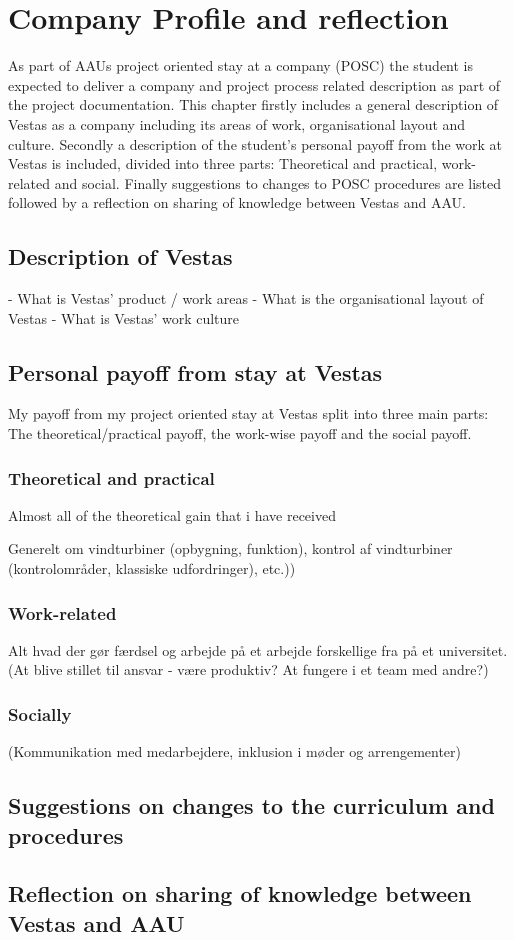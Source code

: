 \section{Company Profile and reflection} \label{company}
As part of AAUs project oriented stay at a company (POSC) the student is expected to deliver a company and project process related description as part of the project documentation. This chapter firstly includes a general description of Vestas as a company including its areas of work, organisational layout and culture. Secondly a description of the student's personal payoff from the work at Vestas is included, divided into three parts: Theoretical and practical, work-related and social. Finally suggestions to changes to POSC procedures are listed followed by a reflection on sharing of knowledge between Vestas and AAU.


\subsection{Description of Vestas}

- What is Vestas' product / work areas
- What is the organisational layout of Vestas
- What is Vestas' work culture



\subsection{Personal payoff from stay at Vestas}
My payoff from my project oriented stay at Vestas split into three main parts: The theoretical/practical payoff, the work-wise payoff and the social payoff.



\subsubsection{Theoretical and practical}
Almost all of the theoretical gain that i have received 

Generelt om vindturbiner (opbygning, funktion), kontrol af vindturbiner (kontrolområder, klassiske udfordringer), etc.))

\subsubsection{Work-related}
Alt hvad der gør færdsel og arbejde på et arbejde forskellige fra på et universitet. (At blive stillet til ansvar - være produktiv? At fungere i et team med andre?)

\subsubsection{Socially}
(Kommunikation med medarbejdere, inklusion i møder og arrengementer)

\subsection{Suggestions on changes to the curriculum and procedures}



\subsection{Reflection on sharing of knowledge between Vestas and AAU}
